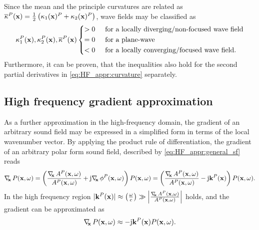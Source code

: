 Since the mean and the principle curvatures are related as $\overline{\kappa}^P(\mathbf{x})  = \frac{1}{2} \left( \kappa_1(\mathbf{x})^P+\kappa_2(\mathbf{x})^P \right)$, wave fields may be classified as
\begin{equation}
\label{eq:HF_appr:curvature_cases}
\kappa_1^P(\vx),\kappa_2^P(\vx),\overline{\kappa}^P(\vx) 
\begin{cases*}
> 0  \hspace{5mm} \text{for a locally diverging/non-focused wave field} \\
= 0  \hspace{5mm} \text{for a plane-wave}  \\
< 0  \hspace{5mm} \text{for a locally converging/focused wave field.} 
\end{cases*}
\end{equation}
Furthermore, it can be proven, that the inequalities also hold for the second partial derivatives in \eqref{eq:HF_appr:curvature} separately.

\subsection{High frequency gradient approximation}
As a further approximation in the high-frequency domain, the gradient of an arbitrary sound field may be expressed in a simplified form in terms of the local wavenumber vector.
By applying the product rule of differentiation, the gradient of an arbitrary polar form sound field, described by \eqref{eq:HF_appr:general_sf} reads
\begin{equation}
\Dx P(\vx,\omega) = \left(  \frac{\Dx A^P(\vx,\omega)}{A^P(\vx,\omega)} + \ti \Dx \phi^P(\vx,\omega) \right) P(\vx,\omega) =  \left(  \frac{\Dx A^P(\vx,\omega)}{A^P(\vx,\omega)} - \ti \vk^P(\vx) \right) P(\vx,\omega).
\end{equation}
In the high frequency region $|\mathbf{k}^P(\mathbf{x})| \approx \left( \frac{\omega}{c} \right) \gg \left| \frac{ \nabla_{\!\!\mathbf{x}}\, A^P(\mathbf{x},\omega)}{A^P(\mathbf{x},\omega)} \right|$ holds, and the gradient can be approximated as
\begin{equation}
\nabla_{\!\!\mathbf{x}}\, P(\mathbf{x},\omega) \approx - \mathrm{j} \mathbf{k}^P(\mathbf{x}) P(\mathbf{x},\omega).
\label{eq:HF_approx:gradient_appr}
\end{equation}

